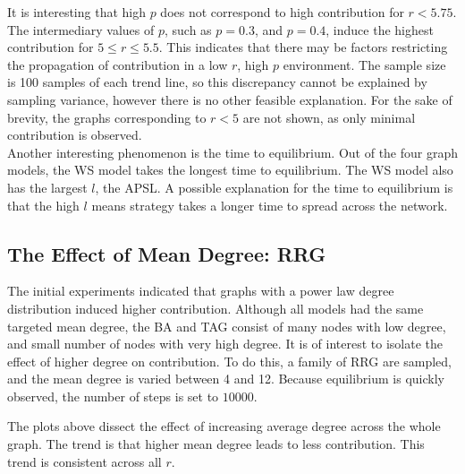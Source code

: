 It is interesting that high $p$ does not correspond to high contribution for $r<5.75$. The intermediary values of $p$, such as $p=0.3$, and $p=0.4$, induce the highest contribution for $5\leq r \leq 5.5$. This indicates that there may be factors restricting the propagation of contribution in a low $r$, high $p$ environment. The sample size is 100 samples of each trend line, so this discrepancy cannot be explained by sampling variance, however there is no other feasible explanation. For the sake of brevity, the graphs corresponding to $r<5$ are not shown, as only minimal contribution is observed. \\

Another interesting phenomenon is the time to equilibrium. Out of the four graph models, the WS model takes the longest time to equilibrium. The WS model also has the largest $l$, the APSL. A possible explanation for the time to equilibrium is that the high $l$ means strategy takes a longer time to spread across the network. 


\subsection{The Effect of Mean Degree: RRG}
The initial experiments indicated that graphs with a power law degree distribution induced higher contribution. Although all models had the same targeted mean degree, the BA and TAG consist of many nodes with low degree, and  small number of nodes with very high degree. It is of interest to isolate the effect of higher degree on contribution. To do this, a family of RRG are sampled, and the mean degree is varied between 4 and 12. Because equilibrium is quickly observed, the number of steps is set to $10 000$.  \\

 \FloatBarrier

 \FloatBarrier


The plots above dissect the effect of increasing average degree across the whole graph. The trend is that higher mean degree leads to less contribution. This trend is consistent across all $r$. \\

